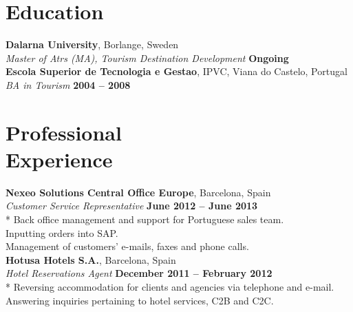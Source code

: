 \documentclass[margin,line]{resume}
\begin{document}
\begin{resume}
    \section{\mysidestyle Education}
    \textbf{Dalarna University}, Borlange, Sweden \vspace{2mm}\\\vspace{1mm}%
    \textsl{Master of Atrs (MA), Tourism Destination Development}\hfill \textbf{ Ongoing}\\
    \textbf{Escola Superior de Tecnologia e Gestao}, IPVC, Viana do Castelo, Portugal \vspace{2mm}\\\vspace{1mm}%
    \textsl{BA in Tourism}\hfill \textbf{ 2004 -- 2008}\\


    \section{\mysidestyle Professional\\Experience}
    \textbf{Nexeo Solutions Central Office Europe}, Barcelona, Spain \vspace{2mm}\\\vspace{1mm}%
    \textsl{Customer Service Representative} \hfill \textbf{June 2012 -- June 2013}\\*
    Back office management and support for Portuguese sales team. \vspace{1mm}\\%
    Inputting orders into SAP. \vspace{1mm}\\%
    Management of customers' e-mails, faxes and phone calls. \vspace{1mm}\\%
    
    \textbf{Hotusa Hotels S.A.}, Barcelona, Spain \vspace{2mm}\\\vspace{1mm}%
    \textsl{Hotel Reservations Agent} \hfill \textbf{December 2011 -- February 2012}\\*
    Reversing accommodation for clients and agencies via telephone and e-mail. \vspace{1mm}\\%
    Answering inquiries pertaining to hotel services, C2B and C2C. \vspace{1mm}\\%
    

\end{resume}
\end{document}
